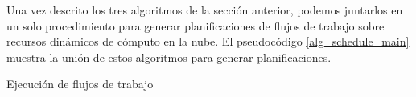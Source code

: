 Una vez descrito los tres algoritmos de la secci\'on anterior, podemos juntarlos en un solo procedimiento para generar planificaciones de flujos de trabajo sobre recursos din\'amicos de c\'omputo en la nube. El pseudoc\'odigo \ref{alg_schedule_main} muestra la unión de estos algoritmos para generar planificaciones.


\begin{algorithm}
\caption{Ejecución de flujos de trabajo}
\label{alg_schedule_main}
\begin{algorithmic}
\EndProcedure
\end{algorithmic}
\end{algorithm}

